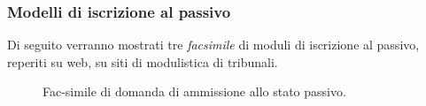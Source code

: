 \subsubsection{Modelli di iscrizione al passivo}

Di seguito verranno mostrati tre \emph{facsimile} di moduli di iscrizione al passivo, reperiti su web, su siti di modulistica di tribunali.

\begin{figure}[H]
\centering
{}
\caption{Fac-simile di domanda di ammissione allo stato passivo.}
\label{fig:modello1}
\end{figure}

